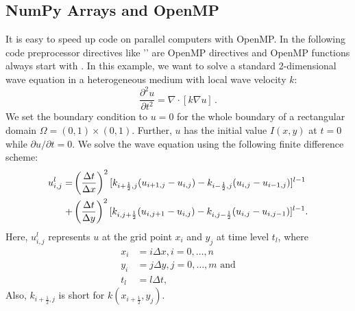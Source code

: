 \subsection{NumPy Arrays and OpenMP}
It is easy to speed up code on parallel computers with OpenMP. In 
the following code preprocessor directives like '' are OpenMP directives and
OpenMP functions always start with .
In this example, we want
to solve a standard 2-dimensional wave equation in a heterogeneous medium with
local wave velocity $k$:
\begin{equation}
\frac{\partial^2u}{\partial t^2} = \nabla \cdot [k\nabla u]\, .
\end{equation}
We set the boundary condition to $u = 0$ for the whole boundary of a
rectangular domain $\Omega = (0,1) \times (0,1)$. Further, $u$ has the initial
value $I(x,y)$ at $t = 0$ while $\partial u/ \partial t = 0$.
We solve the wave equation using the following finite difference scheme:
\begin{align}
u_{i,j}^l =
&\left(\frac{\Delta t}{\Delta x}\right)^2
[k_{i+\frac{1}{2},j}(u_{i+1,j} - u_{i,j}) - k_{i-\frac{1}{2},j}(u_{i,j} - u_{i-1,j})]^{l-1}\notag\\
+&\left(\frac{\Delta t}{\Delta y}\right)^2
[k_{i,j+\frac{1}{2}}(u_{i,j+1} - u_{i,j}) - k_{i,j-\frac{1}{2}}(u_{i,j} - u_{i,j-1})]^{l-1}.
\end{align}\label{u}
Here, $u_{i,j}^l$ represents $u$ at the grid point $x_i$ and $y_j$ at
time level $t_l$, where
\begin{align*}
x_i &= i\Delta x, i = 0, \ldots, n\\
y_i &= j\Delta y, j = 0, \ldots, m\textrm{ and}\\
t_l &= l\Delta t,
\end{align*}
Also, $k_{i+\frac{1}{2},j}$ is short for $k(x_{i+\frac{1}{2}},y_j)$.

